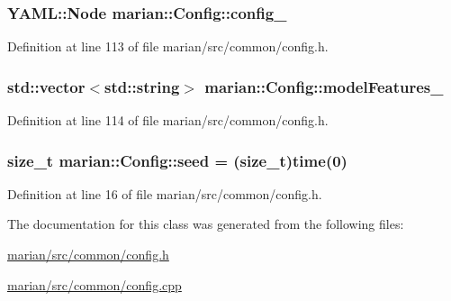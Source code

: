 \subsubsection[{\texorpdfstring{config\+\_\+}{config_}}]{\setlength{\rightskip}{0pt plus 5cm}Y\+A\+M\+L\+::\+Node marian\+::\+Config\+::config\+\_\+\hspace{0.3cm}{\ttfamily [private]}}\hypertarget{classmarian_1_1Config_acbe4dfabd18c2c561be60fa5adc28c3b}{}\label{classmarian_1_1Config_acbe4dfabd18c2c561be60fa5adc28c3b}


Definition at line 113 of file marian/src/common/config.\+h.

\subsubsection[{\texorpdfstring{model\+Features\+\_\+}{modelFeatures_}}]{\setlength{\rightskip}{0pt plus 5cm}std\+::vector$<$std\+::string$>$ marian\+::\+Config\+::model\+Features\+\_\+\hspace{0.3cm}{\ttfamily [private]}}\hypertarget{classmarian_1_1Config_a63b2b2a9be247234930b5e2e55d97e11}{}\label{classmarian_1_1Config_a63b2b2a9be247234930b5e2e55d97e11}


Definition at line 114 of file marian/src/common/config.\+h.

\subsubsection[{\texorpdfstring{seed}{seed}}]{\setlength{\rightskip}{0pt plus 5cm}size\+\_\+t marian\+::\+Config\+::seed = (size\+\_\+t)time(0)\hspace{0.3cm}{\ttfamily [static]}}\hypertarget{classmarian_1_1Config_a5261277034b2e2268225bfbc32682cb4}{}\label{classmarian_1_1Config_a5261277034b2e2268225bfbc32682cb4}


Definition at line 16 of file marian/src/common/config.\+h.



The documentation for this class was generated from the following files\+:\begin{DoxyCompactItemize}
\item 
\hyperlink{marian_2src_2common_2config_8h}{marian/src/common/config.\+h}\item 
\hyperlink{marian_2src_2common_2config_8cpp}{marian/src/common/config.\+cpp}\end{DoxyCompactItemize}
